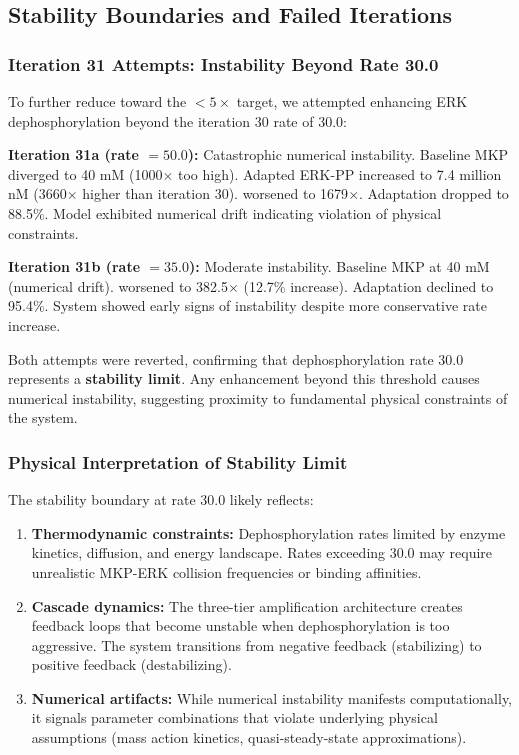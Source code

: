 \documentclass[twocolumn,11pt]{article}
\newcommand{\erk}{ERK}
\newcommand{\mkp}{MKP}
\newcommand{\srr}{\text{SRR}}
\begin{document}
\subsection{Stability Boundaries and Failed Iterations}

\subsubsection{Iteration 31 Attempts: Instability Beyond Rate 30.0}

To further reduce \srr{} toward the $<5\times$ target, we attempted enhancing \erk{} dephosphorylation beyond the iteration 30 rate of 30.0:

\textbf{Iteration 31a (rate $= 50.0$):} Catastrophic numerical instability. Baseline \mkp{} diverged to 40 mM (1000$\times$ too high). Adapted \erk{}-PP increased to 7.4 million nM (3660$\times$ higher than iteration 30). \srr{} worsened to 1679$\times$. Adaptation dropped to 88.5\%. Model exhibited numerical drift indicating violation of physical constraints.

\textbf{Iteration 31b (rate $= 35.0$):} Moderate instability. Baseline \mkp{} at 40 mM (numerical drift). \srr{} worsened to 382.5$\times$ (12.7\% increase). Adaptation declined to 95.4\%. System showed early signs of instability despite more conservative rate increase.

Both attempts were reverted, confirming that dephosphorylation rate 30.0 represents a \textbf{stability limit}. Any enhancement beyond this threshold causes numerical instability, suggesting proximity to fundamental physical constraints of the system.

\subsubsection{Physical Interpretation of Stability Limit}

The stability boundary at rate 30.0 likely reflects:

\begin{enumerate}
\item \textbf{Thermodynamic constraints:} Dephosphorylation rates limited by enzyme kinetics, diffusion, and energy landscape. Rates exceeding 30.0 may require unrealistic \mkp{}-ERK collision frequencies or binding affinities.

\item \textbf{Cascade dynamics:} The three-tier amplification architecture creates feedback loops that become unstable when dephosphorylation is too aggressive. The system transitions from negative feedback (stabilizing) to positive feedback (destabilizing).

\item \textbf{Numerical artifacts:} While numerical instability manifests computationally, it signals parameter combinations that violate underlying physical assumptions (mass action kinetics, quasi-steady-state approximations).
\end{enumerate}
\end{document}
